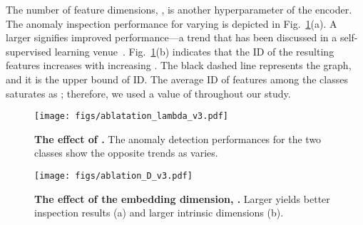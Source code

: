 \documentclass[runningheads]{llncs}
\begin{document}
The number of feature dimensions, , is another hyperparameter of the encoder.
The anomaly inspection performance for varying  is depicted in Fig.~\ref{fig:ablation_D}(a).
A larger  signifies improved performance---a trend that has been discussed in a self-supervised learning venue~\cite{revisit_ssl}.
Fig.~\ref{fig:ablation_D}(b) indicates that the ID of the resulting features increases with increasing .
The black dashed line represents the  graph, and it is the upper bound of ID.
The average ID of features among the classes saturates as ; therefore, we used a value of  throughout our study.

\begin{figure}[t]
  \centering
  \begin{minipage}{0.32\linewidth}
  \centering
    \vspace{1.2em}
    \texttt{[image: figs/ablatation\_lambda\_v3.pdf]}
    \vspace{-2em}
    \caption{\textbf{The effect of .} The anomaly detection performances for the two classes show the opposite trends as  varies.}
    \label{fig:ablation_lambda} 
  \end{minipage}\hfill
  \begin{minipage}{0.63\linewidth}
    \centering
    \vspace{-0.3em}
    \texttt{[image: figs/ablation\_D\_v3.pdf]}
    \vspace{-1em}
    \caption{\textbf{The effect of the embedding dimension, .} Larger  yields better inspection results (a) and larger intrinsic dimensions (b).}
    \label{fig:ablation_D}
  \end{minipage}\hfill
  \vspace{-1em}
\end{figure} 
\end{document}
